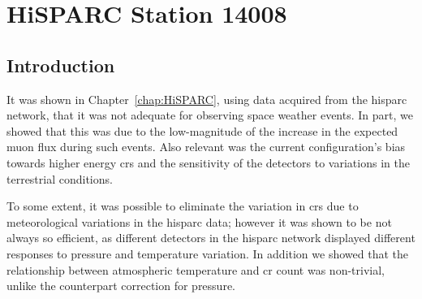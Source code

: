 \chapter{HiSPARC Station 14008}\label{chap:HiSPARC_14008}

\section{Introduction}\label{sec:HS_14008_intro}


%



It was shown in Chapter~\ref{chap:HiSPARC}, using data acquired from the \gls{hisparc} network, that it was not adequate for observing space weather events. In part, we showed that this was due to the low-magnitude of the increase in the expected muon flux during such events. Also relevant was the current configuration's bias towards higher energy \glspl{cr} and the sensitivity of the detectors to variations in the terrestrial conditions.

To some extent, it was possible to eliminate the variation in \glspl{cr} due to meteorological variations in the \gls{hisparc} data; however it was shown to be not always so efficient, as different detectors in the \gls{hisparc} network displayed different responses to pressure and temperature variation. In addition we showed that the relationship between atmospheric temperature and \gls{cr} count was non-trivial, unlike the counterpart correction for pressure.

